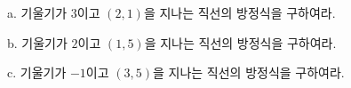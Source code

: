 \documentclass[a4paper]{oblivoir}
\newlength{\frameheight}
\begin{document}
\par\bigskip
a. 기울기가 $3$이고 $(2,1)$을 지나는 직선의 방정식을 구하여라.\par
\begin{minipage}{0.45\textwidth}\centering
\par\bigskip\begin{mdframed}[frametitle=중학교 방식의 풀이]
\vspace{\frameheight}
\end{mdframed}
\end{minipage}
\begin{minipage}{0.45\textwidth}\centering
\par\bigskip\begin{mdframed}[frametitle=공식을 사용한 풀이]
\vspace{\frameheight}
\end{mdframed}
\end{minipage}\bigskip\bigskip\par
\par\bigskip
b. 기울기가 $2$이고 $(1,5)$을 지나는 직선의 방정식을 구하여라.\par
\begin{minipage}{0.45\textwidth}\centering
\par\bigskip\begin{mdframed}[frametitle=중학교 방식의 풀이]
\vspace{\frameheight}
\end{mdframed}
\end{minipage}
\begin{minipage}{0.45\textwidth}\centering
\par\bigskip\begin{mdframed}[frametitle=공식을 사용한 풀이]
\vspace{\frameheight}
\end{mdframed}
\end{minipage}\bigskip\bigskip\par
\par\bigskip
c. 기울기가 $-1$이고 $(3,5)$을 지나는 직선의 방정식을 구하여라.\par
\begin{minipage}{0.45\textwidth}\centering
\par\bigskip\begin{mdframed}[frametitle=중학교 방식의 풀이]
\vspace{\frameheight}
\end{mdframed}
\end{minipage}
\begin{minipage}{0.45\textwidth}\centering
\par\bigskip\begin{mdframed}[frametitle=공식을 사용한 풀이]
\vspace{\frameheight}
\end{mdframed}
\end{minipage}\bigskip\bigskip\par
\end{document}

